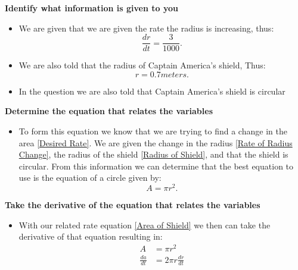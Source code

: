 \documentclass[12pt]{article}
\begin{document}
  \item \textbf{Identify what information is given to you}
  \begin{itemize}
    \item We are given that we are given the rate the radius is increasing, thus:
    \begin{equation}
      \frac{dr}{dt} = \frac{3}{1000}. \tag{Rate of Radius Change} \label{Rate of Radius Change}
    \end{equation}
    \item We are also told that the radius of Captain America's shield, Thus:
    \begin{equation}
      r = 0.7 meters. \tag{Radius of Shield} \label{Radius of Shield}
    \end{equation}
    \item In the question we are also told that Captain America's shield is circular
  \end{itemize}
  \item \textbf{Determine the equation that relates the variables}
    \begin {itemize}
      \item To form this equation we know that we are trying to find a change in the area \eqref{Desired Rate}. We are given the change in the radius \eqref{Rate of Radius Change}, the radius of the shield \eqref{Radius of Shield}, and that the shield is circular. From this information we can determine that the best equation to use is the equation of a circle given by:
      \begin{equation}
        A = \pi r^2. \tag{Related Rate Equation} \label{Area of Shield}
      \end{equation}
    \end{itemize}
  \item \textbf{Take the derivative of the equation that relates the variables}
    \begin{itemize}
      \item With our related rate equation \eqref{Area of Shield} we then can take the derivative of that equation resulting in:
      \begin{equation}
      \begin{split}
        A &= \pi r^2\\
        \frac{da}{dt} &= 2 \pi r \frac{dr}{dt}
      \end{split}
      \tag{Derivative of Equation} \label{DRRE}
      \end{equation}
    \end{itemize}
\end{document}
